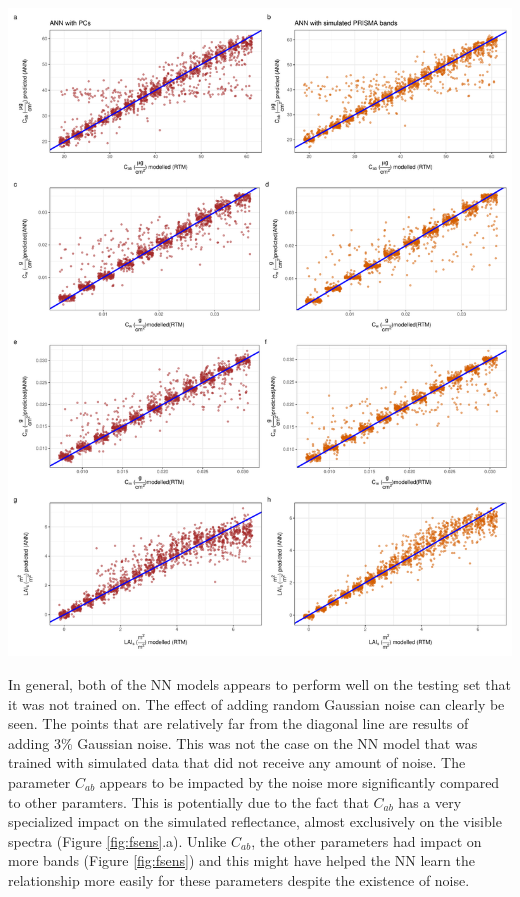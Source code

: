 \documentclass[a4paper, twoside]{templates/ociamthesis}
\let\origfigure\figure
\let\endorigfigure\endfigure
\renewenvironment{figure}[1][2] {
    \expandafter\origfigure\expandafter[H]
} {
    \endorigfigure
}
\begin{document}
\newpage

\begin{figure}
\includegraphics[width=1\linewidth]{./figures/preds_test} \caption{Predicted versus modelled RTM parameters for the PCA based NN (1st column) and NN with simulated PRISMA bands (2nd column)}\label{fig:predstest}
\end{figure}

In general, both of the NN models appears to perform well on the testing set that it was not trained on. The effect of adding random Gaussian noise can clearly be seen. The points that are relatively far from the diagonal line are results of adding 3\% Gaussian noise. This was not the case on the NN model that was trained with simulated data that did not receive any amount of noise. The parameter \(C_{ab}\) appears to be impacted by the noise more significantly compared to other paramters. This is potentially due to the fact that \(C_{ab}\) has a very specialized impact on the simulated reflectance, almost exclusively on the visible spectra (Figure \ref{fig:fsens}.a). Unlike \(C_{ab}\), the other parameters had impact on more bands (Figure \ref{fig:fsens}) and this might have helped the NN learn the relationship more easily for these parameters despite the existence of noise.
\end{document}
